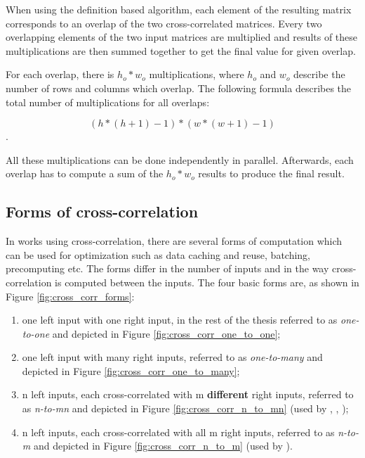 When using the definition based algorithm, each element of the resulting matrix corresponds to an overlap of the two cross-correlated matrices. Every two overlapping elements of the two input matrices are multiplied and results of these multiplications are then summed together to get the final value for given overlap.

For each overlap, there is $h_o * w_o$ multiplications, where $h_o$ and $w_o$ describe the number of rows and columns which overlap. The following formula describes the total number of multiplications for all overlaps:

\[
	(h*(h+1)-1)*(w*(w+1)-1)
\].

All these multiplications can be done independently in parallel. Afterwards, each overlap has to compute a sum of the $h_o * w_o$ results to produce the final result.



\subsection{Forms of cross-correlation}
\label{sec:cross_corr_forms}

In works using cross-correlation, there are several forms of computation which can be used for optimization such as data caching and reuse, batching, precomputing etc. The forms differ in the number of inputs and in the way cross-correlation is computed between the inputs. 
The four basic forms are, as shown in Figure \ref{fig:cross_corr_forms}:

\begin{enumerate}
	\item one left input with one right input, in the rest of the thesis referred to as \textit{one-to-one} and depicted in Figure \ref{fig:cross_corr_one_to_one};
	\item one left input with many right inputs, referred to as \textit{one-to-many} and depicted in Figure \ref{fig:cross_corr_one_to_many};
	\item n left inputs, each cross-correlated with m \textbf{different} right inputs, referred to as \textit{n-to-mn} and depicted in Figure \ref{fig:cross_corr_n_to_mn} (used by \citet{misko}, \citet{zhang2015}, \citet{Kapinchev2015});
	\item n left inputs, each cross-correlated with all m right inputs, referred to as \textit{n-to-m} and depicted in Figure \ref{fig:cross_corr_n_to_m} (used by \citet{Clark2011}).
\end{enumerate} 

